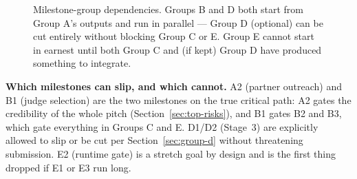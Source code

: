 \documentclass[11pt,a4paper]{article}
\begin{document}
\begin{figure}[h!]
\centering
{}
\caption{Milestone-group dependencies. Groups B and D both start from Group
A's outputs and run in parallel --- Group D (optional) can be cut entirely
without blocking Group C or E. Group E cannot start in earnest until both
Group C and (if kept) Group D have produced something to integrate.}
\label{fig:dependency-flow}
\end{figure}

\begin{noteb}
\textbf{Which milestones can slip, and which cannot.} A2 (partner outreach)
and B1 (judge selection) are the two milestones on the true critical path:
A2 gates the credibility of the whole pitch (Section~\ref{sec:top-risks}),
and B1 gates B2 and B3, which gate everything in Groups C and E. D1/D2
(Stage~3) are explicitly allowed to slip or be cut per
Section~\ref{sec:group-d} without threatening submission. E2 (runtime gate)
is a stretch goal by design and is the first thing dropped if E1 or E3 run
long.
\end{noteb}
\end{document}
